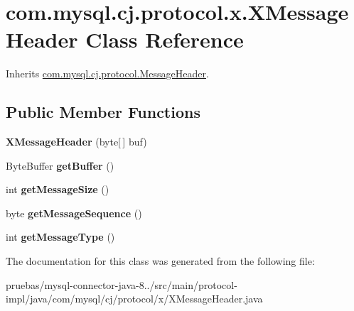 \hypertarget{classcom_1_1mysql_1_1cj_1_1protocol_1_1x_1_1_x_message_header}{}\section{com.\+mysql.\+cj.\+protocol.\+x.\+X\+Message\+Header Class Reference}
\label{classcom_1_1mysql_1_1cj_1_1protocol_1_1x_1_1_x_message_header}


Inherits \mbox{\hyperlink{interfacecom_1_1mysql_1_1cj_1_1protocol_1_1_message_header}{com.\+mysql.\+cj.\+protocol.\+Message\+Header}}.

\subsection*{Public Member Functions}
\begin{DoxyCompactItemize}
\item 
\mbox{\label{classcom_1_1mysql_1_1cj_1_1protocol_1_1x_1_1_x_message_header_aa60831715b293388c3b5767aa69f714c}} 
{\bfseries X\+Message\+Header} (byte\mbox{[}$\,$\mbox{]} buf)
\item 
\mbox{\label{classcom_1_1mysql_1_1cj_1_1protocol_1_1x_1_1_x_message_header_a5afa56bd029e353dd7f93b86e43a692f}} 
Byte\+Buffer {\bfseries get\+Buffer} ()
\item 
\mbox{\label{classcom_1_1mysql_1_1cj_1_1protocol_1_1x_1_1_x_message_header_a7a585e24fbcd4364793244041eb81dcd}} 
int {\bfseries get\+Message\+Size} ()
\item 
\mbox{\label{classcom_1_1mysql_1_1cj_1_1protocol_1_1x_1_1_x_message_header_abfa0f85a9c79c4b91d062b6bf8e52d8b}} 
byte {\bfseries get\+Message\+Sequence} ()
\item 
\mbox{\label{classcom_1_1mysql_1_1cj_1_1protocol_1_1x_1_1_x_message_header_a97ea98c4f2519880ea76fc4698e9e99d}} 
int {\bfseries get\+Message\+Type} ()
\end{DoxyCompactItemize}


The documentation for this class was generated from the following file\+:\begin{DoxyCompactItemize}
\item 
pruebas/mysql-\/connector-\/java-\/8../src/main/protocol-\/impl/java/com/mysql/cj/protocol/x/X\+Message\+Header.\+java\end{DoxyCompactItemize}
